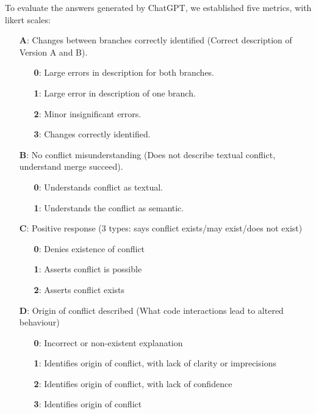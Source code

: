 To evaluate the answers generated by ChatGPT, we established five metrics, with likert scales:
%
\begin{itemize}
  \item[\textbf{A}:] Changes between branches correctly identified (Correct description of Version A and B).
  \begin{itemize}
    \item[\textbf{0}:] Large errors in description for both branches.
    \item[\textbf{1}:] Large error in description of one branch.
    \item[\textbf{2}:] Minor insignificant errors.
    \item[\textbf{3}:] Changes correctly identified.
  \end{itemize}

  \item[\textbf{B}:] No conflict misunderstanding (Does not describe textual conflict, understand merge succeed).
  \begin{itemize}
    \item[\textbf{0}:] Understands conflict as textual.
    \item[\textbf{1}:] Understands the conflict as semantic.
  \end{itemize}

  \item[\textbf{C}:] Positive response (3 types: says conflict exists/may exist/does not exist)
  \begin{itemize}
    \item[\textbf{0}:] Denies existence of conflict
    \item[\textbf{1}:] Asserts conflict is possible
    \item[\textbf{2}:] Asserts conflict exists
  \end{itemize}

  \item[\textbf{D}:] Origin of conflict described (What code interactions lead to altered behaviour)
  \begin{itemize}
    \item[\textbf{0}:] Incorrect or non-existent explanation
    \item[\textbf{1}:] Identifies origin of conflict, with lack of clarity or imprecisions
    \item[\textbf{2}:] Identifies origin of conflict, with lack of confidence
    \item[\textbf{3}:] Identifies origin of conflict
  \end{itemize}


\end{itemize}
